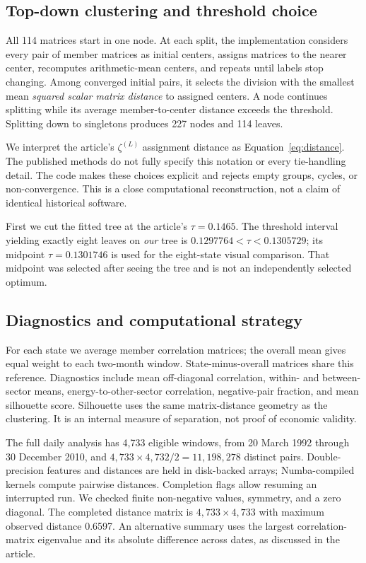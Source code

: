 \documentclass[11pt,a4paper]{article}
\begin{document}
\subsection{Top-down clustering and threshold choice}
All 114 matrices start in one node. At each split, the implementation considers every pair of member matrices as initial centers, assigns matrices to the nearer center, recomputes arithmetic-mean centers, and repeats until labels stop changing. Among converged initial pairs, it selects the division with the smallest mean \emph{squared scalar matrix distance} to assigned centers. A node continues splitting while its average member-to-center distance exceeds the threshold. Splitting down to singletons produces 227 nodes and 114 leaves.

We interpret the article's $\zeta^{(L)}$ assignment distance as Equation~\eqref{eq:distance}. The published methods do not fully specify this notation or every tie-handling detail. The code makes these choices explicit and rejects empty groups, cycles, or non-convergence. This is a close computational reconstruction, not a claim of identical historical software.

First we cut the fitted tree at the article's $\tau=0.1465$. The threshold interval yielding exactly eight leaves on \emph{our} tree is $0.1297764<\tau<0.1305729$; its midpoint $\tau=0.1301746$ is used for the eight-state visual comparison. That midpoint was selected after seeing the tree and is not an independently selected optimum.

\subsection{Diagnostics and computational strategy}
For each state we average member correlation matrices; the overall mean gives equal weight to each two-month window. State-minus-overall matrices share this reference. Diagnostics include mean off-diagonal correlation, within- and between-sector means, energy-to-other-sector correlation, negative-pair fraction, and mean silhouette score. Silhouette uses the same matrix-distance geometry as the clustering. It is an internal measure of separation, not proof of economic validity.

The full daily analysis has 4,733 eligible windows, from 20 March 1992 through 30 December 2010, and $4{,}733\times4{,}732/2=11{,}198{,}278$ distinct pairs. Double-precision features and distances are held in disk-backed arrays; Numba-compiled kernels compute pairwise distances. Completion flags allow resuming an interrupted run. We checked finite non-negative values, symmetry, and a zero diagonal. The completed distance matrix is $4{,}733\times4{,}733$ with maximum observed distance 0.6597. An alternative summary uses the largest correlation-matrix eigenvalue and its absolute difference across dates, as discussed in the article.
\end{document}
